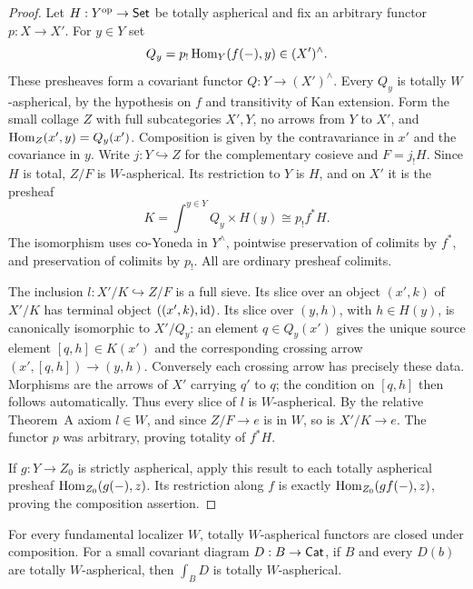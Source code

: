 \begin{proof}
Let $H:Y^{\mathrm{op}}\to\mathsf{Set}$ be totally aspherical and fix
an arbitrary functor $p:X\to X'$. For $y\in Y$ set
\[
 Q_y=p_!\operatorname{Hom}_Y(f(-),y)\in (X')^{\wedge}.
\]
These presheaves form a covariant functor
$Q:Y\to(X')^{\wedge}$. Every $Q_y$ is totally
$W$-aspherical, by the hypothesis on $f$ and
transitivity of Kan extension. Form the small collage
$Z$ with full subcategories $X',Y$, no arrows from
$Y$ to $X'$, and
$\operatorname{Hom}_Z(x',y)=Q_y(x')$. Composition is given by the
contravariance in $x'$ and the covariance in $y$.
Write $j:Y\hookrightarrow Z$ for the complementary
cosieve and $F=j_!H$. Since $H$ is total, $Z/F$ is
$W$-aspherical. Its restriction to $Y$ is $H$, and
on $X'$ it is the presheaf
\[
 K=\int^{y\in Y} Q_y\times H(y)
   \cong p_! f^*H.
\]
The isomorphism uses co-Yoneda in $Y^{\wedge}$,
pointwise preservation of colimits by $f^*$, and
preservation of colimits by $p_!$. All are ordinary
presheaf colimits.

The inclusion $l:X'/K\hookrightarrow Z/F$ is a
full sieve. Its slice over an object $(x',k)$ of
$X'/K$ has terminal object $((x',k),\mathrm{id})$.
Its slice over $(y,h)$, with $h\in H(y)$, is
canonically isomorphic to $X'/Q_y$: an element
$q\in Q_y(x')$ gives the unique source element
$[q,h]\in K(x')$ and the corresponding crossing
arrow $(x',[q,h])\to(y,h)$. Conversely each
crossing arrow has precisely these data. Morphisms
are the arrows of $X'$ carrying $q'$ to $q$;
the condition on $[q,h]$ then follows automatically.
Thus every slice of $l$ is $W$-aspherical. By the
relative Theorem~A axiom $l\in W$, and since
$Z/F\to e$ is in $W$, so is $X'/K\to e$.
The functor $p$ was arbitrary, proving totality of
$f^*H$.

If $g:Y\to Z_0$ is strictly aspherical, apply this
result to each totally aspherical presheaf
$\operatorname{Hom}_{Z_0}(g(-),z)$. Its restriction along $f$
is exactly $\operatorname{Hom}_{Z_0}(gf(-),z)$, proving the
composition assertion.
\end{proof}

\begin{theorem}\label{F:total-functor-general}
For every fundamental localizer $W$, totally $W$-aspherical
functors are closed under composition. For a small covariant
diagram $D:B\to\mathsf{Cat}$, if $B$ and every $D(b)$ are totally
$W$-aspherical, then $\int_BD$ is totally $W$-aspherical.
\end{theorem}

